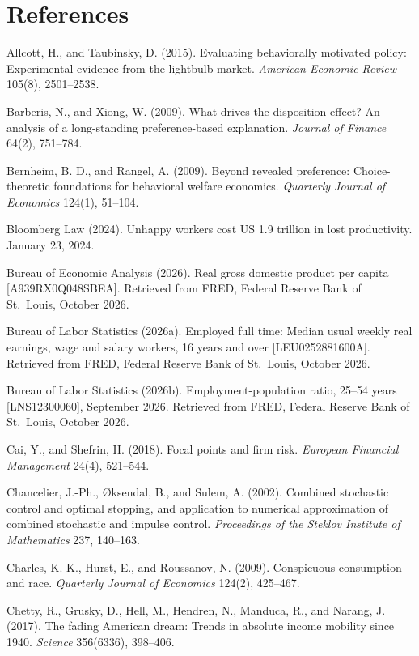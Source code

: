 \section*{References}
\small
\raggedright
\setlength{\parindent}{0pt}
\setlength{\parskip}{4pt}

Allcott, H., and Taubinsky, D. (2015). Evaluating behaviorally motivated policy: Experimental evidence from the lightbulb market. \emph{American Economic Review} 105(8), 2501--2538.

Barberis, N., and Xiong, W. (2009). What drives the disposition effect? An analysis of a long-standing preference-based explanation. \emph{Journal of Finance} 64(2), 751--784.

Bernheim, B. D., and Rangel, A. (2009). Beyond revealed preference: Choice-theoretic foundations for behavioral welfare economics. \emph{Quarterly Journal of Economics} 124(1), 51--104.

Bloomberg Law (2024). Unhappy workers cost US {}1.9 trillion in lost productivity. January 23, 2024.

Bureau of Economic Analysis (2026). Real gross domestic product per capita [A939RX0Q048SBEA]. Retrieved from FRED, Federal Reserve Bank of St.\ Louis, October 2026.

Bureau of Labor Statistics (2026a). Employed full time: Median usual weekly real earnings, wage and salary workers, 16 years and over [LEU0252881600A]. Retrieved from FRED, Federal Reserve Bank of St.\ Louis, October 2026.

Bureau of Labor Statistics (2026b). Employment-population ratio, 25--54 years [LNS12300060], September 2026. Retrieved from FRED, Federal Reserve Bank of St.\ Louis, October 2026.

Cai, Y., and Shefrin, H. (2018). Focal points and firm risk. \emph{European Financial Management} 24(4), 521--544.

Chancelier, J.-Ph., \O ksendal, B., and Sulem, A. (2002). Combined stochastic control and optimal stopping, and application to numerical approximation of combined stochastic and impulse control. \emph{Proceedings of the Steklov Institute of Mathematics} 237, 140--163.

Charles, K. K., Hurst, E., and Roussanov, N. (2009). Conspicuous consumption and race. \emph{Quarterly Journal of Economics} 124(2), 425--467.

Chetty, R., Grusky, D., Hell, M., Hendren, N., Manduca, R., and Narang, J. (2017). The fading American dream: Trends in absolute income mobility since 1940. \emph{Science} 356(6336), 398--406.

